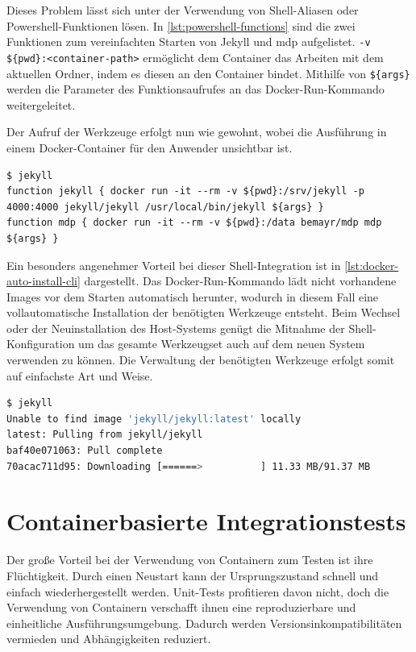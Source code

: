 Dieses Problem lässt sich unter der Verwendung von Shell-Aliasen oder Powershell-Funktionen lösen.
In \cref{lst:powershell-functions} sind die zwei Funktionen zum vereinfachten Starten von Jekyll und mdp aufgelistet.
\texttt{-v \$\{pwd\}:<container-path>} ermöglicht dem Container das Arbeiten mit dem aktuellen Ordner, indem es diesen an den Container bindet.
Mithilfe von \texttt{\$\{args\}} werden die Parameter des Funktionsaufrufes an das Docker-Run-Kommando weitergeleitet.

Der Aufruf der Werkzeuge erfolgt nun wie gewohnt, wobei die Ausführung in einem Docker-Container für den Anwender unsichtbar ist.

\begin{lstlisting}[caption=Powershell-Funktionen für Docker-Kommandos, label=lst:powershell-functions]
$ jekyll
function jekyll { docker run -it --rm -v ${pwd}:/srv/jekyll -p 4000:4000 jekyll/jekyll /usr/local/bin/jekyll ${args} }
function mdp { docker run -it --rm -v ${pwd}:/data bemayr/mdp mdp ${args} }
\end{lstlisting}
Ein besonders angenehmer Vorteil bei dieser Shell-Integration ist in \cref{lst:docker-auto-install-cli} dargestellt.
Das Docker-Run-Kommando lädt nicht vorhandene Images vor dem Starten automatisch herunter, wodurch in diesem Fall eine vollautomatische Installation der benötigten Werkzeuge entsteht.
Beim Wechsel oder der Neuinstallation des Host-Systems genügt die Mitnahme der Shell-Konfiguration um das gesamte Werkzeugset auch auf dem neuen System verwenden zu können.
Die Verwaltung der benötigten Werkzeuge erfolgt somit auf einfachste Art und Weise.

\begin{lstlisting}[caption=Automatische Installation der Docker-basierten CLI-Anwendungen, language=bash, label=lst:docker-auto-install-cli]
$ jekyll
Unable to find image 'jekyll/jekyll:latest' locally
latest: Pulling from jekyll/jekyll
baf40e071063: Pull complete
70acac711d95: Downloading [======>          ] 11.33 MB/91.37 MB
\end{lstlisting}

\section{Containerbasierte Integrationstests}
\label{sec:containerbasiertes-integrationstests}
Der große Vorteil bei der Verwendung von Containern zum Testen ist ihre Flüchtigkeit.
Durch einen Neustart kann der Ursprungszustand schnell und einfach wiederhergestellt werden.
Unit-Tests profitieren davon nicht, doch die Verwendung von Containern verschafft ihnen eine reproduzierbare und einheitliche Ausführungsumgebung.
Dadurch werden Versionsinkompatibilitäten vermieden und Abhängigkeiten reduziert.

